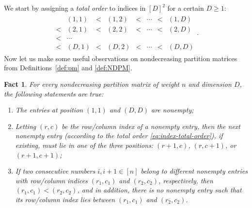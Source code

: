 \documentclass[12pt,reqno]{amsart}
\numberwithin{equation}{section}
\theoremstyle{theorem}
\newtheorem{fact}[theorem]{Fact}
\theoremstyle{definition}
\theoremstyle{named}
\begin{document}
We start by assigning a \emph{total order} to indices in $[D]^2$ for a certain $D\ge 1$:
\begin{align}\label{eq:index-total-order}
	\begin{array}{cccccccc}
		& (1,1) & < & (1,2) & < & \cdots & < & (1,D)\\
		< & (2,1) & < & (2,2) & < & \cdots & < & (2,D)\\
		< & \cdots\\
		< & (D,1) & < & (D,2) & < & \cdots & < & (D,D)
	\end{array}.
\end{align}
Now let us make some useful observations on nondecreasing partition matrices from Definitions~\ref{def:pm} and \ref{def:NDPM}.

\begin{fact}\label{fact:NDPM}
	For every nondecreasing partition matrix of weight $n$ and dimension $D$, the following statements are true:
	\begin{enumerate}[label={\textup{(\arabic{*})}}, leftmargin=*, labelsep=5pt, align=left, itemsep=2pt, topsep=2pt, parsep=2pt]
		\item The entries at position $(1,1)$ and $(D,D)$ are nonempty;
		
		\item Letting $(r,c)$ be the row/column index of a nonempty entry, then the next nonempty entry (according to the total order \eqref{eq:index-total-order}), if existing, must lie in one of the three positions: $(r+1,c)$, $(r,c+1)$, or $(r+1,c+1)$;
		
		\item If two consecutive numbers $i,i+1\in[n]$ belong to different nonempty entries with row/column indices $(r_1,c_1)$ and $(r_2,c_2)$, respectively, then $(r_1,c_1) < (r_2,c_2)$, and in addition, there is no nonempty entry such that its row/column index lies between $(r_1,c_1)$ and $(r_2,c_2)$.
	\end{enumerate}
\end{fact}
\end{document}
